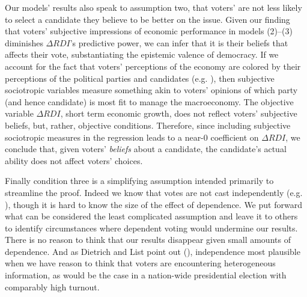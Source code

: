 \documentclass[11pt]{article}
\begin{document}
Our models' results also speak to assumption two, that voters' are not less likely to select a candidate they believe to be better on the issue. %
Given our finding that voters' subjective impressions of economic performance in models (2)--(3) diminishes $\Delta RDI$'s predictive power, we can infer that it is their beliefs that affects their vote, substantiating the epistemic valence of democracy.
If we account for the fact that voters' perceptions of the economy are colored by their perceptions of the political parties and candidates (e.g. \cite{evans2006political}), then subjective sociotropic variables measure something akin to voters' opinions of which party (and hence candidate) is most fit to manage the macroeconomy.
The objective variable $\Delta RDI$, short term economic growth, does not reflect voters' subjective beliefs, but, rather, objective conditions.
Therefore, since including subjective sociotropic measures in the regression leads to a near-0 coefficient on $\Delta RDI$, we conclude that, given voters' \emph{beliefs} about a candidate, the candidate's actual ability does not affect voters' choices. 

Finally condition three is a simplifying assumption intended primarily to streamline the proof. Indeed we know that votes are not cast independently (e.g. \citet{sinclair2012social}), though it is hard to know the size of the effect of dependence. We put forward what can be considered the least complicated assumption and leave it to others to identify circumstances where dependent voting would undermine our results. There is no reason to think that our results disappear given small amounts of dependence. And as Dietrich and List point out (\citeyear{Dietrich2004}), independence most plausible when we have reason to think that voters are encountering heterogeneous information, as would be the case in a nation-wide presidential election with comparably high turnout.
\end{document}
